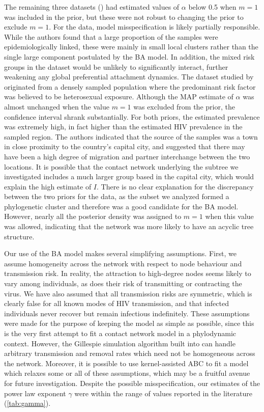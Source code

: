 The remaining three datasets (\textcite{cuevas2009hiv, novitsky2014impact,
li2015hiv}) had estimated values of $\alpha$ below 0.5 when $m = 1$ was
included in the prior, but these were not robust to changing the prior to
exclude $m = 1$. For the \citeauthor{cuevas2009hiv} data, model
misspecification is likely partially responsible. While the authors found that
a large proportion of the samples were epidemiologically linked, these were
mainly in small local clusters rather than the single large component
postulated by the BA model. In addition, the mixed risk groups in the dataset
would be unlikely to significantly interact, further weakening any global
preferential attachment dynamics. The dataset studied by
\textcite{novitsky2014impact} originated from a densely sampled population
where the predominant risk factor was believed to be heterosexual exposure.
Although the MAP estimate of $\alpha$ was almost unchanged when the value $m =
1$ was excluded from the prior, the confidence interval shrank substantially.
For both priors, the estimated prevalence was extremely high, in fact higher
than the estimated HIV prevalence in the sampled region. The authors indicated
that the source of the samples was a town in close proximity to the country's
capital city, and suggested that there may have been a high degree of migration
and partner interchange between the two locations. It is possible that the
contact network underlying the subtree we investigated includes a much larger
group based in the capital city, which would explain the high estimate of $I$.
There is no clear explanation for the discrepancy between the two priors for
the \textcite{li2015hiv} data, as the subset we analyzed formed a phylogenetic
cluster and therefore was a good candidate for the BA model. However, nearly
all the posterior density was assigned to $m = 1$ when this value was allowed,
indicating that the network was more likely to have an acyclic tree structure.

Our use of the \gls{BA} model makes several simplifying assumptions. First, we
assume homogeneity across the network with respect to node behaviour and
transmission risk. In reality, the attraction to high-degree nodes seems likely
to vary among individuals, as does their risk of transmitting or contracting
the virus. We have also assumed that all transmission risks are symmetric,
which is clearly false for all known modes of \gls{HIV} transmission, and that
infected individuals never recover but remain infectious indefinitely. These
assumptions were made for the purpose of keeping the model as simple as
possible, since this is the very first attempt to fit a contact network model
in a phylodynamic context. However, the Gillespie simulation algorithm built
into  can handle arbitrary transmission and removal rates
which need not be homogeneous across the network. Moreover, it is possible to
use kernel-assisted \gls{ABC} to fit a model which relaxes some or all of these
assumptions, which may be a fruitful avenue for future investigation. 
Despite the possible misspecification, our estimates of the power
law exponent $\gamma$ were within the range of values reported in the
literature (\cref{tab:gamma}).
